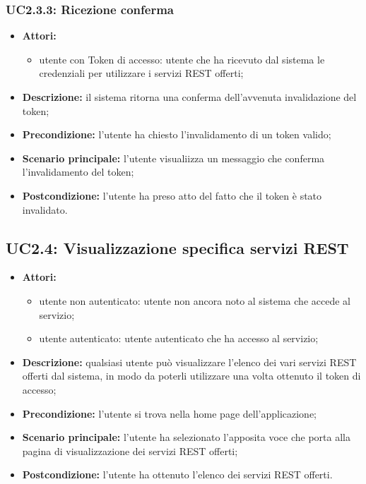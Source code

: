 \subsubsection{UC2.3.3: Ricezione conferma}
\begin{itemize}
	\item \textbf{Attori:}
	\begin{itemize}
		\item utente con Token di accesso: utente che ha ricevuto dal sistema le credenziali per utilizzare i servizi REST offerti;
	\end{itemize}
	\item \textbf{Descrizione:} il sistema ritorna una conferma dell'avvenuta invalidazione del token;
	\item \textbf{Precondizione:} l'utente ha chiesto l'invalidamento di un token valido;
	\item \textbf{Scenario principale:} l'utente visualiizza un messaggio che conferma l'invalidamento del token;
	\item \textbf{Postcondizione:} l'utente ha preso atto del fatto che il token è stato invalidato.
\end{itemize}

\subsection{UC2.4: Visualizzazione specifica servizi REST}
\begin{itemize}
	\item \textbf{Attori:}
	\begin{itemize}
		\item utente non autenticato: utente non ancora noto al sistema che accede al servizio;
		\item utente autenticato: utente autenticato che ha accesso al servizio;
	\end{itemize}
	\item \textbf{Descrizione:} qualsiasi utente può visualizzare l'elenco dei vari servizi REST offerti dal sistema, in modo da poterli utilizzare una volta ottenuto il token di accesso;
	\item \textbf{Precondizione:} l'utente si trova nella home page dell'applicazione;
	\item \textbf{Scenario principale:} l'utente ha selezionato l'apposita voce che porta alla pagina di visualizzazione dei servizi REST offerti;
	\item \textbf{Postcondizione:} l'utente ha ottenuto l'elenco dei servizi REST offerti.
\end{itemize}

\pagebreak
